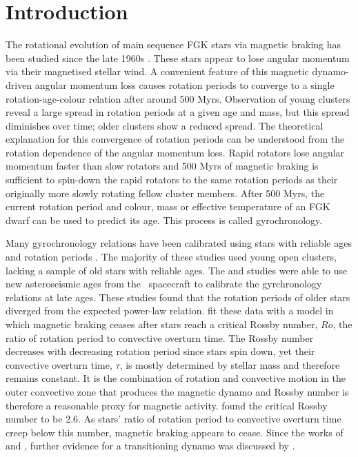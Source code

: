 \newcommand{\nastero}{40}
\newcommand{\meansep}{1}

\section{Introduction}

The rotational evolution of main sequence FGK stars via magnetic braking has
been studied since the late 1960s \citep[\eg][]{Weber, Skumanich}.
These stars appear to lose angular momentum via their magnetised stellar wind.
A convenient feature of this magnetic dynamo-driven angular momentum loss
causes rotation periods to converge to a single rotation-age-colour relation
after around 500 Myrs.
Observation of young clusters reveal a large spread in rotation periods at a
given age and mass, but this spread diminishes over time; older clusters show
a reduced spread.
The theoretical explanation for this convergence of rotation periods can be
understood from the rotation dependence of the angular momentum loss.
Rapid rotators lose angular momentum faster than slow rotators and 500 Myrs of
magnetic braking is sufficient to spin-down the rapid rotators to the same
rotation periods as their originally more slowly rotating fellow cluster
members.
After 500 Myrs, the current rotation period and colour, mass or effective
temperature of an FGK dwarf can be used to predict its age.
This process is called gyrochronology.

Many gyrochronology relations have been calibrated using stars with reliable
ages and rotation periods \citep[\eg][]{Barnes2007, Mamajek2008, Meibom2010,
Angus2015, Vansaders2016}.
The majority of these studies used young open clusters, lacking a sample of
old stars with reliable ages.
The \citet{Angus2015} and \citet{Vansaders2016} studies were able to use new
asteroseismic ages from the \kepler\ spacecraft to calibrate the gyrchronology
relations at late ages.
These studies found that the rotation periods of older stars diverged from the
expected power-law relation.
\citet{Vansaders2016} fit these data with a model in which magnetic braking
ceases after stars reach a critical Rossby number, $Ro$, the ratio of rotation
period to convective overturn time.
The Rossby number decreases with decreasing rotation period since stars spin
down, yet their convective overturn time, $\tau$, is mostly determined by
stellar mass and therefore remains constant.
It is the combination of rotation and convective motion in the outer
convective zone that produces the magnetic dynamo and Rossby number is
therefore a reasonable proxy for magnetic activity.
\citet{Vansaders2016} found the critical Rossby number to be 2.6.
As stars' ratio of rotation period to convective overturn time creep below
this number, magnetic braking appears to cease.
Since the works of \citet{Angus2015} and \citet{Vansaders2016}, further
evidence for a transitioning dynamo was discussed by \citet{...}.

